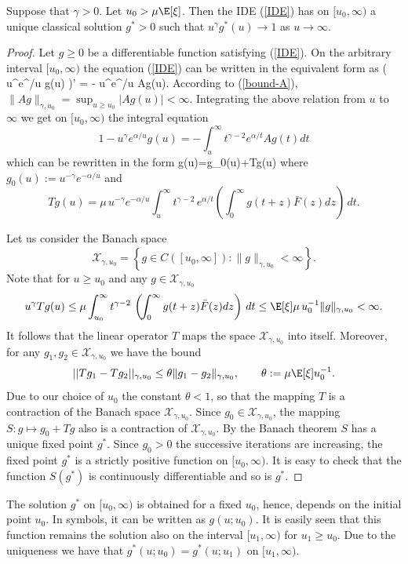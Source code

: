 \begin{lemma} Suppose that $\gamma>0$. Let $u_0>\mu \E[\xi]$. Then 
 the IDE (\ref{IDE}) has on $[u_0,\infty)$ a unique classical solution $g^*>0$ such that $u^\gamma g^*(u)\to 1$ as $u\to \infty$.
\end{lemma}
\begin{proof} Let $g\ge 0$ be a differentiable function satisfying (\ref{IDE}). On the arbitrary interval $[u_0,\infty)$ the equation (\ref{IDE}) can be written in the equivalent form as 
\beq
\label{IDE1}
\big( u^\gamma e^{\alpha/u} g(u) \big)' = - u^{}e^{\alpha/u} Ag(u).
\eeq
According to (\ref{bound-A}), $\|Ag\|_{\gamma,u_0}=\sup_{u\ge u_0} |Ag(u)|<\infty $. 
Integrating the above relation from $u$ to $\infty$ we get on $[u_0,\infty)$ the integral equation
$$
1-u^\gamma e^{\alpha/u} g(u)=- \int_u^\infty t^{\gamma-2}e^{\alpha/t} Ag(t)dt
$$
which can be rewritten in the form 
\beq
\label{g-Tg}
g(u)=g_0(u)+Tg(u)
\eeq
where $g_0(u):=u^{-\gamma} e^{-\alpha/u}$ and 
$$
 T g(u) = \mu\,u^{-\gamma} e^{-\alpha/u} \int_{u}^{\infty} t^{\gamma-2}\,e^{\alpha/t} \left(\!\int_{0}^{\infty} g(t+z)\bar F(z)dz\right)\,dt.
$$

Let us consider the Banach space 
$$
\mathcal{X}_{\gamma,u_0} = \left\{ g \in C([u_0, \infty]) \colon \|g\|_{\gamma,u_0} < \infty \right\}. 
$$
Note that for $u\ge u_0$ and any $g\in \mathcal{X}_{\gamma,u_0}$
$$
u^{\gamma} T g(u) \le \mu \int_{u_0}^{\infty} t^{\gamma-2}\,\left(\!\int_{0}^{\infty} g(t+z)\bar F(z)dz\right)\,dt\le \E[\xi]
\mu\,u_0^{-1}\|g\|_{\gamma,u_0} <\infty. 
$$
It follows that the linear operator $T$ maps the space $\mathcal{X}_{\gamma,u_0}$ into itself. 
Moreover, for any $g_1,g_2\in \mathcal{X}_{\gamma,u_0}$ we have the bound 
$$
||T g_1-T g_2||_{\gamma,u_0}\le 
\theta \|g_1-g_2\|_{\gamma,u_0}, \qquad \theta:=\mu \E[\xi]u_0^{-1}.
$$
Due to our choice of $u_0$ the constant $\theta<1$, so that the mapping $T$ is a contraction of the Banach space $\mathcal{X}_{\gamma,u_0}$. Since $g_0\in \mathcal{X}_{\gamma,u_0}$, the mapping $S: g\mapsto g_0+Tg$ also is a contraction of $\mathcal{X}_{\gamma,u_0}$. 
By the Banach theorem $S$ has a unique fixed point $g^*$. Since $g_0>0$ the successive iterations are increasing, the fixed point $g^*$ is a strictly positive function on $[u_0,\infty)$. It is easy to check that the function $S (g^*)$ is continuously differentiable and so is $g^*$. \fdem 
\end{proof}

\begin{remark} 
\label{rem1}
The solution $g^*$ on $[u_0,\infty)$ is obtained for a fixed $u_0$, hence, depends on the initial point $u_0$. In symbols, it can be written as $g(u;u_0)$. It is easily seen that this function remains the solution also on the interval $[u_1,\infty)$ for $u_1\ge u_0$. Due to the uniqueness we have that $g^*(u;u_0)=g^*(u;u_1)$ on $[u_1,\infty)$. 
\end{remark}

